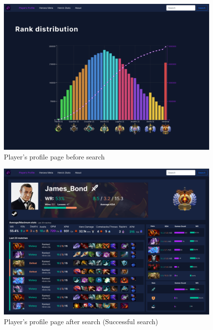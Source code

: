    \begin{figure}[ht]
        \centering
        \includegraphics[width=\textwidth]{images/PlayerProfileStartPage}
        \caption{Player's profile page before search}
    \end{figure}

    \begin{figure}[ht]
        \centering
        \includegraphics[width=\textwidth]{images/PlayerProfile}
        \caption{Player's profile page after search (Successful search)}
    \end{figure}

